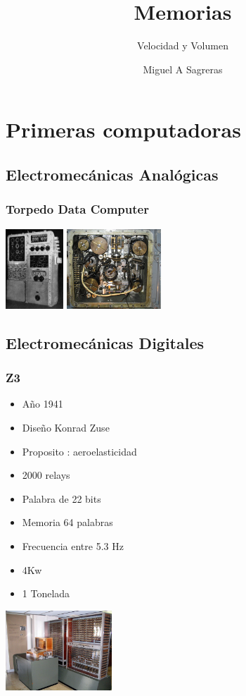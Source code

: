 \documentclass{beamer}
\title{Memorias}
\subtitle{Velocidad y Volumen}
\author[msagre]{Miguel A Sagreras}
\date[2015]{}
\begin{document}
\begin{frame}
\titlepage
\end{frame}

\section{Primeras computadoras}
\subsection{Electromecánicas Analógicas}
\begin{frame}
\frametitle{Torpedo Data Computer}
\begin{center}
\hfill
\includegraphics[height=3cm]{TDC-image.jpg}
\hfill
\includegraphics[height=3cm]{TDC-inside.jpg}
\end{center}
\end{frame}

\subsection{Electromecánicas Digitales}
\begin{frame}
\frametitle{Z3}
\begin{itemize}
	\item Año 1941
	\item Diseño Konrad Zuse
	\item Proposito : aeroelasticidad
	\item 2000 relays
	\item Palabra de 22 bits
	\item Memoria 64 palabras
	\item Frecuencia entre 5.3 Hz
	\item 4Kw
	\item 1 Tonelada
\end{itemize}
\begin{center}
\includegraphics[height=3cm]{Z3_Deutsches_Museum.JPG}
\end{center}
\end{frame}
\end{document}
